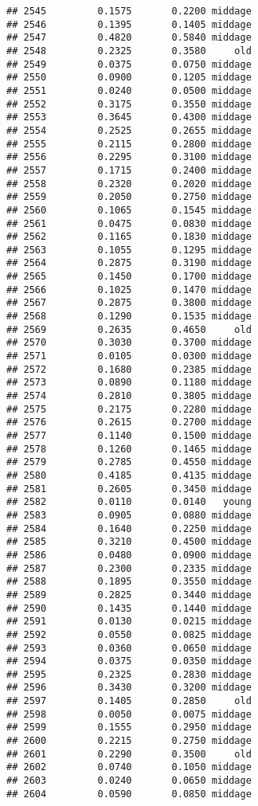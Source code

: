 \documentclass[
]{article}
\begin{document}
\begin{verbatim}
## 2545         0.1575       0.2200 middage
## 2546         0.1395       0.1405 middage
## 2547         0.4820       0.5840 middage
## 2548         0.2325       0.3580     old
## 2549         0.0375       0.0750 middage
## 2550         0.0900       0.1205 middage
## 2551         0.0240       0.0500 middage
## 2552         0.3175       0.3550 middage
## 2553         0.3645       0.4300 middage
## 2554         0.2525       0.2655 middage
## 2555         0.2115       0.2800 middage
## 2556         0.2295       0.3100 middage
## 2557         0.1715       0.2400 middage
## 2558         0.2320       0.2020 middage
## 2559         0.2050       0.2750 middage
## 2560         0.1065       0.1545 middage
## 2561         0.0475       0.0830 middage
## 2562         0.1165       0.1830 middage
## 2563         0.1055       0.1295 middage
## 2564         0.2875       0.3190 middage
## 2565         0.1450       0.1700 middage
## 2566         0.1025       0.1470 middage
## 2567         0.2875       0.3800 middage
## 2568         0.1290       0.1535 middage
## 2569         0.2635       0.4650     old
## 2570         0.3030       0.3700 middage
## 2571         0.0105       0.0300 middage
## 2572         0.1680       0.2385 middage
## 2573         0.0890       0.1180 middage
## 2574         0.2810       0.3805 middage
## 2575         0.2175       0.2280 middage
## 2576         0.2615       0.2700 middage
## 2577         0.1140       0.1500 middage
## 2578         0.1260       0.1465 middage
## 2579         0.2785       0.4550 middage
## 2580         0.4185       0.4135 middage
## 2581         0.2605       0.3450 middage
## 2582         0.0110       0.0140   young
## 2583         0.0905       0.0880 middage
## 2584         0.1640       0.2250 middage
## 2585         0.3210       0.4500 middage
## 2586         0.0480       0.0900 middage
## 2587         0.2300       0.2335 middage
## 2588         0.1895       0.3550 middage
## 2589         0.2825       0.3440 middage
## 2590         0.1435       0.1440 middage
## 2591         0.0130       0.0215 middage
## 2592         0.0550       0.0825 middage
## 2593         0.0360       0.0650 middage
## 2594         0.0375       0.0350 middage
## 2595         0.2325       0.2830 middage
## 2596         0.3430       0.3200 middage
## 2597         0.1405       0.2850     old
## 2598         0.0050       0.0075 middage
## 2599         0.1555       0.2950 middage
## 2600         0.2215       0.2750 middage
## 2601         0.2290       0.3500     old
## 2602         0.0740       0.1050 middage
## 2603         0.0240       0.0650 middage
## 2604         0.0590       0.0850 middage

\end{verbatim}
\end{document}

